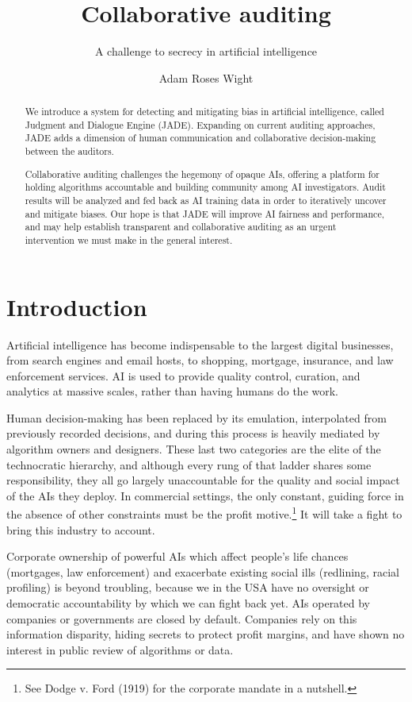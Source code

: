 \documentclass[format=sigconf]{acmart}
\title{Collaborative auditing} \subtitle{A challenge to secrecy in artificial intelligence}
\author{Adam Roses Wight}
\affiliation{Wikimedia Foundation}
\begin{document}
\begin{abstract}
We introduce a system for detecting and mitigating bias in artificial intelligence, called Judgment and Dialogue Engine (JADE).  Expanding on current auditing approaches, JADE adds a dimension of human communication and collaborative decision-making between the auditors.

Collaborative auditing challenges the hegemony of opaque AIs, offering a platform for holding algorithms accountable and building community among AI investigators.  Audit results will be analyzed and fed back as AI training data in order to iteratively uncover and mitigate biases.  Our hope is that JADE will improve AI fairness and performance, and may help establish transparent and collaborative auditing as an urgent intervention we must make in the general interest.
\end{abstract}

\maketitle

\section{Introduction}

Artificial intelligence has become indispensable to the largest digital businesses, from search engines and email hosts, to shopping, mortgage, insurance, and law enforcement services.  AI is used to provide quality control, curation, and analytics at massive scales, rather than having humans do the work.

Human decision-making has been replaced by its emulation, interpolated from previously recorded decisions, and during this process is heavily mediated by algorithm owners and designers.  These last two categories are the elite of the technocratic hierarchy, and although every rung of that ladder shares some responsibility, they all go largely unaccountable for the quality and social impact of the AIs they deploy.  In commercial settings, the only constant, guiding force in the absence of other constraints must be the profit motive.\footnote{See Dodge v. Ford (1919) for the corporate mandate in a nutshell.}  It will take a fight to bring this industry to account.

Corporate ownership of powerful AIs which affect people's life chances (mortgages, law enforcement) and exacerbate existing social ills (redlining, racial profiling) is beyond troubling, because we in the USA have no oversight or democratic accountability by which we can fight back yet.  AIs operated by companies or governments are closed by default.  Companies rely on this information disparity, hiding secrets to protect profit margins, and have shown no interest in public review of algorithms or data.
\end{document}
